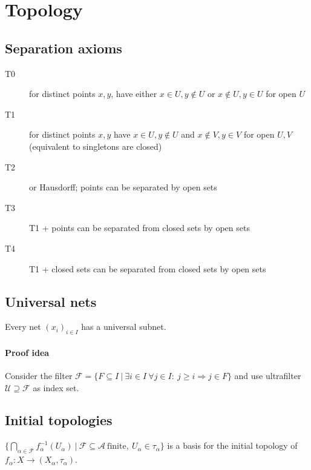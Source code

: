 \documentclass{scrartcl}
\begin{document}
\section{Topology}

\subsection{Separation axioms}
\begin{description}
    \item[T0] for distinct points $x, y$, have either $x \in U, y \notin U$ or $x \notin U, y \in U$ for open $U$
    \item[T1] for distinct points $x, y$ have $x \in U, y \notin U$ and $x \notin V, y \in V$ for open $U, V$ (equivalent to singletons are closed)
    \item[T2] or Hausdorff; points can be separated by open sets
    \item[T3] T1 + points can be separated from closed sets by open sets
    \item[T4] T1 + closed sets can be separated from closed sets by open sets
\end{description}

\subsection{Universal nets}
Every net $(x_i)_{i \in I}$ has a universal subnet.
\paragraph{Proof idea} 
Consider the filter $\mathcal{F} = \{F \subseteq I \ | \ \exists i \in I \ \forall j \in I: \ j \geq i \Rightarrow j \in F\}$ and use ultrafilter $\mathcal{U} \supseteq \mathcal{F}$ as index set.

\subsection{Initial topologies}
$\{ \bigcap_{\alpha \in \mathcal{F}} f_\alpha^{-1}(U_\alpha) \ | \ \mathcal{F} \subseteq \mathcal{A} \ \text{finite}, \ U_\alpha \in \tau_\alpha \}$ is a basis for the initial topology of $f_\alpha: X \to (X_\alpha, \tau_\alpha)$.
\end{document}

